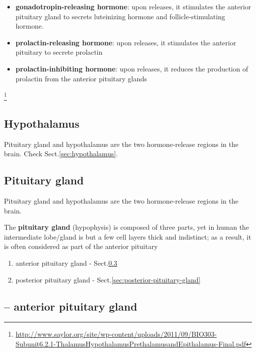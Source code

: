 \begin{enumerate}
\begin{itemize}
    \item {\bf gonadotropin-releasing hormone}: upon releases, it stimulates the
    anterior pituitary gland to secrets luteinizing hormone and
    follicle-stimulating hormone.
    
    \item {\bf prolactin-releasing hormone}: upon releases, it stimulates the
    anterior pituitary to secrete prolactin
    
    \item {\bf prolactin-inhibiting hormone}: upon releases, it reduces the
    production of prolactin from the anterior pituitary glands
  \end{itemize}
 \end{enumerate}
 \footnote{\url{http://www.saylor.org/site/wp-content/uploads/2011/09/BIO303-Subunit6.2.1-ThalamusHypothalamusPrethalamusandEpithalamus-Final.pdf}}

\subsection{Hypothalamus}

Pituitary gland and hypothalamus are the two hormone-release regions in the
brain. Check Sect.\ref{sec:hypothalamus}.

\subsection{Pituitary gland}
\label{sec:pituitary-gland}

Pituitary gland and hypothalamus are the two hormone-release regions in the
brain.

The {\bf pituitary gland} (hypophysis) is composed of three parts, yet in human
the intermediate lobe/gland is but a few cell layers thick and indistinct; as a
result, it is often considered as part of the anterior pituitary
\begin{enumerate} 
  \item anterior pituitary gland - Sect.\ref{sec:anterior-pituitary-gland}
  
  \item posterior pituitary gland - Sect.\ref{sec:posterior-pituitary-gland}
\end{enumerate}

\subsection{-- anterior pituitary gland}
\label{sec:anterior-pituitary-gland}

